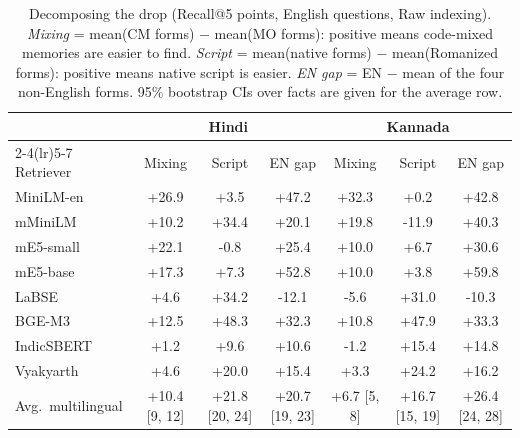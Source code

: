 \begin{table}[t]
\centering
\small
\caption{Decomposing the drop (Recall@5 points, English questions, Raw indexing). \emph{Mixing} = mean(CM forms) $-$ mean(MO forms): positive means code-mixed memories are easier to find. \emph{Script} = mean(native forms) $-$ mean(Romanized forms): positive means native script is easier. \emph{EN gap} = EN $-$ mean of the four non-English forms. 95\% bootstrap CIs over facts are given for the average row.}
\label{tab:factorial}
\begin{tabular}{@{}l ccc ccc@{}}
\toprule
 & \multicolumn{3}{c}{Hindi} & \multicolumn{3}{c}{Kannada} \\
\cmidrule(lr){2-4}\cmidrule(lr){5-7}
Retriever & Mixing & Script & EN gap & Mixing & Script & EN gap \\
\midrule
MiniLM-en & +26.9 & +3.5 & +47.2 & +32.3 & +0.2 & +42.8 \\
mMiniLM & +10.2 & +34.4 & +20.1 & +19.8 & -11.9 & +40.3 \\
mE5-small & +22.1 & -0.8 & +25.4 & +10.0 & +6.7 & +30.6 \\
mE5-base & +17.3 & +7.3 & +52.8 & +10.0 & +3.8 & +59.8 \\
LaBSE & +4.6 & +34.2 & -12.1 & -5.6 & +31.0 & -10.3 \\
BGE-M3 & +12.5 & +48.3 & +32.3 & +10.8 & +47.9 & +33.3 \\
IndicSBERT & +1.2 & +9.6 & +10.6 & -1.2 & +15.4 & +14.8 \\
Vyakyarth & +4.6 & +20.0 & +15.4 & +3.3 & +24.2 & +16.2 \\
\midrule
Avg.\ multilingual & +10.4 [9, 12] & +21.8 [20, 24] & +20.7 [19, 23] & +6.7 [5, 8] & +16.7 [15, 19] & +26.4 [24, 28] \\
\bottomrule
\end{tabular}
\end{table}
